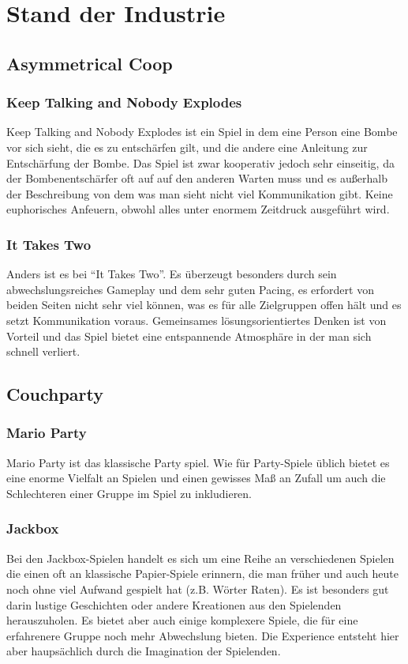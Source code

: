 \chapter{Stand der Industrie\label{_industrie}}

\section{Asymmetrical Coop}

\subsection{Keep Talking and Nobody Explodes}
Keep Talking and Nobody Explodes ist ein Spiel in dem eine Person eine Bombe vor sich sieht, die es zu entschärfen gilt, und die andere eine Anleitung zur Entschärfung der Bombe. Das Spiel ist zwar kooperativ jedoch sehr einseitig, da der Bombenentschärfer oft auf auf den anderen Warten muss und es außerhalb der Beschreibung von dem was man sieht nicht viel Kommunikation gibt. Keine euphorisches Anfeuern, obwohl alles unter enormem Zeitdruck ausgeführt wird.

\subsection{It Takes Two}
Anders ist es bei "`It Takes Two"'. Es überzeugt besonders durch sein abwechslungsreiches Gameplay und dem sehr guten Pacing, es erfordert von beiden Seiten nicht sehr viel können, was es für alle Zielgruppen offen hält und es setzt Kommunikation voraus. Gemeinsames lösungsorientiertes Denken ist von Vorteil und das Spiel bietet eine entspannende Atmosphäre in der man sich schnell verliert.

\section{Couchparty}

\subsection{Mario Party}
Mario Party ist das klassische Party spiel. Wie für Party-Spiele üblich bietet es eine enorme Vielfalt an Spielen und einen gewisses Maß an Zufall um auch die Schlechteren einer Gruppe im Spiel zu inkludieren.

\subsection{Jackbox}
Bei den Jackbox-Spielen handelt es sich um eine Reihe an verschiedenen Spielen die einen oft an klassische Papier-Spiele erinnern, die man früher und auch heute noch ohne viel Aufwand gespielt hat (z.B. Wörter Raten). Es ist besonders gut darin lustige Geschichten oder andere Kreationen aus den Spielenden herauszuholen. Es bietet aber auch einige komplexere Spiele, die für eine erfahrenere Gruppe noch mehr Abwechslung bieten. Die Experience entsteht hier aber haupsächlich durch die Imagination der Spielenden.

